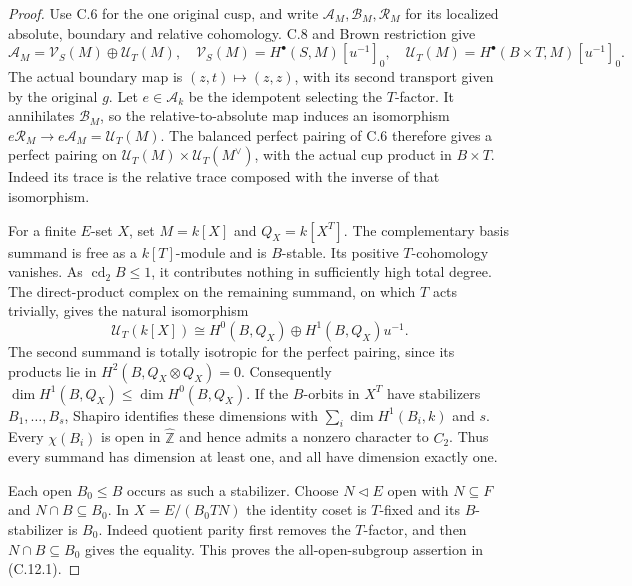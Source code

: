 \begin{proof}
Use C.6 for the one original cusp, and write
$\mathcal A_M,\mathcal B_M,\mathcal R_M$ for
its localized absolute, boundary and relative
cohomology.  C.8 and Brown restriction give
\[
 \mathcal A_M=\mathcal V_S(M)\oplus\mathcal U_T(M),\quad
 \mathcal V_S(M)=H^\bullet(S,M)[u^{-1}]_0,\quad
 \mathcal U_T(M)=H^\bullet(B\times T,M)[u^{-1}]_0.
\]
The actual boundary map is $(z,t)\mapsto(z,z)$,
with its second transport given by the original
$g$.  Let $e\in\mathcal A_k$ be the idempotent
selecting the $T$-factor.  It annihilates
$\mathcal B_M$, so the relative-to-absolute
map induces an isomorphism
$e\mathcal R_M\to e\mathcal A_M=\mathcal U_T(M)$.
The balanced perfect pairing of C.6 therefore
gives a perfect pairing on
$\mathcal U_T(M)\times\mathcal U_T(M^\vee)$,
with the actual cup product in $B\times T$.
Indeed its trace is the relative trace composed
with the inverse of that isomorphism.

For a finite $E$-set $X$, set $M=k[X]$ and
$Q_X=k[X^T]$.  The complementary basis summand
is free as a $k[T]$-module and is $B$-stable.
Its positive $T$-cohomology vanishes.  As
$\operatorname{cd}_2B\leq1$, it contributes
nothing in sufficiently high total degree.
The direct-product complex on the remaining
summand, on which $T$ acts trivially, gives
the natural isomorphism
\[
 \mathcal U_T(k[X])
       \cong H^0(B,Q_X)\oplus H^1(B,Q_X)u^{-1}.              \tag{C.12.3}
\]
The second summand is totally isotropic for
the perfect pairing, since its products lie
in $H^2(B,Q_X\otimes Q_X)=0$.  Consequently
$\dim H^1(B,Q_X)\leq\dim H^0(B,Q_X)$.
If the $B$-orbits in $X^T$ have stabilizers
$B_1,\ldots,B_s$, Shapiro identifies these
dimensions with $\sum_i\dim H^1(B_i,k)$
and $s$.  Every $\chi(B_i)$ is open in
$\widehat{\mathbb Z}$ and hence admits a
nonzero character to $C_2$.  Thus every
summand has dimension at least one, and
all have dimension exactly one.

Each open $B_0\leq B$ occurs as such a
stabilizer.  Choose $N\lhd E$ open with
$N\subseteq F$ and $N\cap B\subseteq B_0$.
In $X=E/(B_0TN)$ the identity coset is
$T$-fixed and its $B$-stabilizer is $B_0$.
Indeed quotient parity first removes the
$T$-factor, and then $N\cap B\subseteq B_0$
gives the equality.  This proves the
all-open-subgroup assertion in (C.12.1).


\end{proof}

